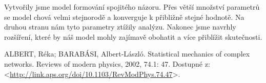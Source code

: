 \documentclass[10pt,a4paper]{report}
\begin{document}
Vytvořily jsme model formování spojitého názoru. Přes větší množství pa\-ra\-met\-rů se model chová velmi stejnorodě a konverguje k přibližně stejné hodnotě. Na druhou stranu nám tyto parametry ztížily analýzu. Nakonec jsme navrhly rozšíření, které by náš model mohly zajímavě obohatit a více přiblížit skutečnosti.

\markboth{}{}
\bgroup

\begin{thebibliography}{9}
ALBERT, Réka; BARABÁSI, Albert-László. Statistical mechanics of complex networks. Reviews of modern physics, 2002, 74.1: 47. Dostupné z: <\url{http://link.aps.org/doi/10.1103/RevModPhys.74.47}>.
\end{thebibliography}
\egroup
\end{document}
